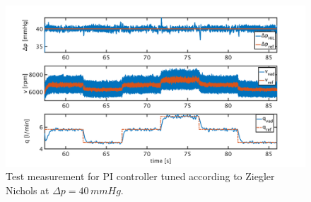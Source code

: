 \begin{figure}[ht]
  \centering
  \includegraphics[width=\textwidth]{images/chapt_5/pi_contr_zn_40.pdf}
  \caption[Test measurement for PI controller tuned according to Ziegler Nichols at $\Delta{p}=40\,mmHg$]{Test measurement for PI controller tuned according to Ziegler Nichols at $\Delta{p}=40\,mmHg$.}
  \label{fig:anh_8}
\end{figure}
